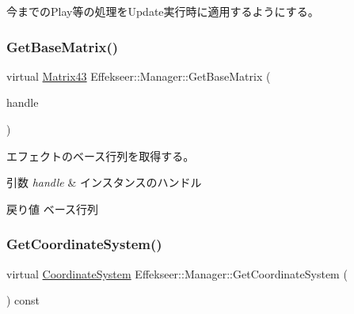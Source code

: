 今までの\+Play等の処理を\+Update実行時に適用するようにする。 

\mbox{\label{class_effekseer_1_1_manager_a095085007e1df5de623fea1a96c31a04}} 
\subsubsection{\texorpdfstring{Get\+Base\+Matrix()}{GetBaseMatrix()}}
{\footnotesize\ttfamily virtual \mbox{\hyperlink{struct_effekseer_1_1_matrix43}{Matrix43}} Effekseer\+::\+Manager\+::\+Get\+Base\+Matrix (\begin{DoxyParamCaption}\item[{\mbox{\hyperlink{namespace_effekseer_afba58b8d812da862190e9bbfc040824a}{Handle}}}]{handle }\end{DoxyParamCaption})\hspace{0.3cm}{\ttfamily [pure virtual]}}



エフェクトのベース行列を取得する。 


\begin{DoxyParams}{引数}
{\em handle} & インスタンスのハンドル \\
\hline
\end{DoxyParams}
\begin{DoxyReturn}{戻り値}
ベース行列 
\end{DoxyReturn}
\mbox{\label{class_effekseer_1_1_manager_a10a79ead8392a39a9f43e771c7de067c}} 
\subsubsection{\texorpdfstring{Get\+Coordinate\+System()}{GetCoordinateSystem()}}
{\footnotesize\ttfamily virtual \mbox{\hyperlink{namespace_effekseer_ac8508f8823c5fcf36aac5d2ddee23765}{Coordinate\+System}} Effekseer\+::\+Manager\+::\+Get\+Coordinate\+System (\begin{DoxyParamCaption}{ }\end{DoxyParamCaption}) const\hspace{0.3cm}{\ttfamily [pure virtual]}}




